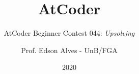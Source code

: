 \title{AtCoder}
\subtitle{AtCoder Beginner Contest 044: {\it Upsolving}}
\author{Prof. Edson Alves - UnB/FGA}
\date{2020}
